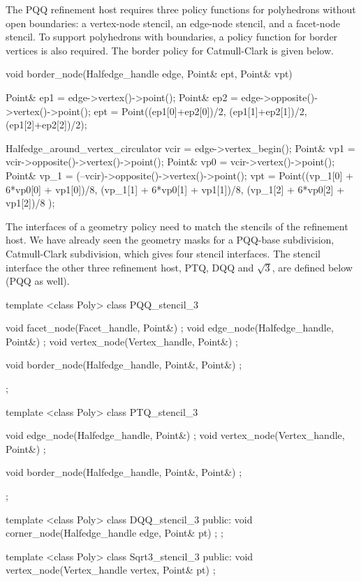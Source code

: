 The PQQ refinement host requires three policy functions for 
polyhedrons without open boundaries: a vertex-node 
stencil, an edge-node stencil, and a facet-node stencil. 
To support polyhedrons with boundaries, a policy function
for border vertices is also required. The border policy for
Catmull-Clark is given below.


\begin{ccExampleCode}
  void border_node(Halfedge_handle edge, Point& ept, Point& vpt) {
    Point& ep1 = edge->vertex()->point();
    Point& ep2 = edge->opposite()->vertex()->point();
    ept = Point((ep1[0]+ep2[0])/2, (ep1[1]+ep2[1])/2, (ep1[2]+ep2[2])/2);

    Halfedge_around_vertex_circulator vcir = edge->vertex_begin();
    Point& vp1  = vcir->opposite()->vertex()->point();
    Point& vp0  = vcir->vertex()->point();
    Point& vp_1 = (--vcir)->opposite()->vertex()->point();
    vpt = Point((vp_1[0] + 6*vp0[0] + vp1[0])/8,
                (vp_1[1] + 6*vp0[1] + vp1[1])/8,
                (vp_1[2] + 6*vp0[2] + vp1[2])/8 );
  }
\end{ccExampleCode}


The interfaces of a geometry policy need to match the stencils of 
the refinement host. We have already seen the geometry masks for
a PQQ-base subdivision, Catmull-Clark subdivision, which gives
four stencil interfaces. The stencil interface the other three 
refinement host, PTQ, DQQ and $\sqrt{3}$, are defined below 
(PQQ as well).


\begin{ccExampleCode}
template <class Poly>
class PQQ_stencil_3 {
  void facet_node(Facet_handle, Point&) {};
  void edge_node(Halfedge_handle, Point&) {};
  void vertex_node(Vertex_handle, Point&) {};

  void border_node(Halfedge_handle, Point&, Point&) {};
};

template <class Poly>
class PTQ_stencil_3 {
  void edge_node(Halfedge_handle, Point&) {};
  void vertex_node(Vertex_handle, Point&) {};

  void border_node(Halfedge_handle, Point&, Point&) {};
};

template <class Poly>
class DQQ_stencil_3 {
public:
  void corner_node(Halfedge_handle edge, Point& pt) {};
};

template <class Poly>
class Sqrt3_stencil_3 {
public:
  void vertex_node(Vertex_handle vertex, Point& pt) {}
};
\end{ccExampleCode}

